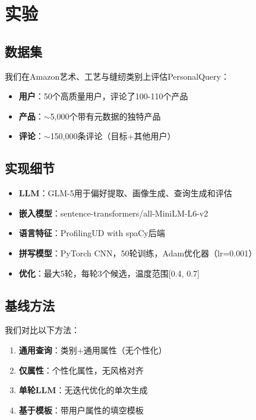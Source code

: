 \documentclass[11pt,a4paper]{article}
\begin{document}
\section{实验}

\subsection{数据集}

我们在Amazon艺术、工艺与缝纫类别上评估PersonalQuery：
\begin{itemize}
    \item \textbf{用户}：50个高质量用户，评论了100-110个产品
    \item \textbf{产品}：$\sim$5,000个带有元数据的独特产品
    \item \textbf{评论}：$\sim$150,000条评论（目标+其他用户）
\end{itemize}

\subsection{实现细节}

\begin{itemize}
    \item \textbf{LLM}：GLM-5用于偏好提取、画像生成、查询生成和评估
    \item \textbf{嵌入模型}：sentence-transformers/all-MiniLM-L6-v2
    \item \textbf{语言特征}：ProfilingUD with spaCy后端
    \item \textbf{拼写模型}：PyTorch CNN，50轮训练，Adam优化器（lr=0.001）
    \item \textbf{优化}：最大5轮，每轮3个候选，温度范围[0.4, 0.7]
\end{itemize}

\subsection{基线方法}

我们对比以下方法：
\begin{enumerate}
    \item \textbf{通用查询}：类别+通用属性（无个性化）
    \item \textbf{仅属性}：个性化属性，无风格对齐
    \item \textbf{单轮LLM}：无迭代优化的单次生成
    \item \textbf{基于模板}：带用户属性的填空模板
\end{enumerate}
\end{document}
